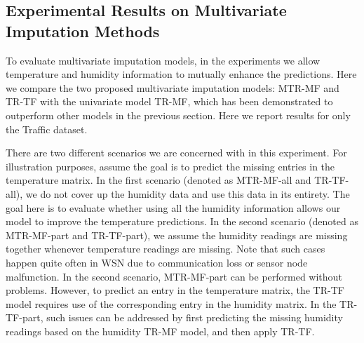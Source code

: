 \subsection{Experimental Results on Multivariate Imputation Methods}




To evaluate multivariate imputation models, in the experiments we allow temperature and humidity information to mutually enhance the predictions.
Here we compare the two proposed multivariate imputation models: MTR-MF and TR-TF with the univariate model TR-MF, which has been demonstrated to outperform other models in the previous section. 
Here we report results for only the Traffic dataset.

There are two different scenarios we are concerned with in this experiment.
For illustration purposes, assume the goal is to predict the missing entries in the temperature matrix.
In the first scenario (denoted as MTR-MF-all and TR-TF-all), we do not cover up the humidity data and use this data in its entirety.
The goal here is to evaluate whether using all the humidity information allows our model to improve the temperature predictions.
In the second scenario (denoted as MTR-MF-part and TR-TF-part), we assume the humidity readings are missing together whenever temperature readings are missing.
Note that such cases happen quite often in WSN due to communication loss or sensor node malfunction.
In the second scenario, MTR-MF-part can be performed without problems.
However, to predict an entry in the temperature matrix, the TR-TF model requires use of the corresponding entry in the humidity matrix.
In the TR-TF-part, such issues can be addressed by first predicting the missing humidity readings based on the humidity TR-MF model, and then apply TR-TF.

